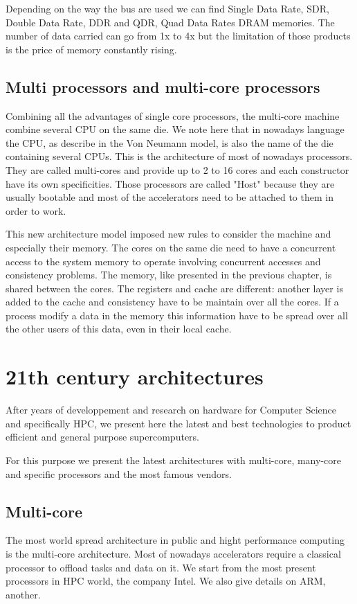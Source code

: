Depending on the way the bus are used we can find Single Data Rate, SDR, Double Data Rate, DDR and QDR, Quad Data Rates DRAM memories. 
The number of data carried can go from 1x to 4x but the limitation of those products is the price of memory constantly rising. 



\subsection{Multi processors and multi-core processors}

Combining all the advantages of single core processors, the multi-core machine combine several CPU on the same die. 
We note here that in nowadays language the CPU, as describe in the Von Neumann model, is also the name of the die containing several CPUs. 
This is the architecture of most of nowadays processors. 
They are called multi-cores and provide up to 2 to 16 cores and each constructor have its own specificities. 
Those processors are called "Host" because they are usually bootable and most of the accelerators need to be attached to them in order to work.

This new architecture model imposed new rules to consider the machine and especially their memory. 
The cores on the same die need to have a concurrent access to the system memory to operate involving concurrent accesses and consistency problems.
The memory, like presented in the previous chapter, is shared between the cores. 
The registers and cache are different: another layer is added to the cache and consistency have to be maintain over all the cores. 
If a process modify a data in the memory this information have to be spread over all the other users of this data, even in their local cache. 

\section{21th century architectures}
After years of developpement and research on hardware for Computer Science and specifically HPC, we present here the latest and best technologies to product efficient and general purpose supercomputers.

For this purpose we present the latest architectures with multi-core, many-core and specific processors and the most famous vendors. 

\subsection{Multi-core}
The most world spread architecture in public and hight performance computing is the multi-core architecture. 
Most of nowadays accelerators require a classical processor to offload tasks and data on it. 
We start from the most present processors in HPC world, the company Intel. 
We also give details on ARM, another.

